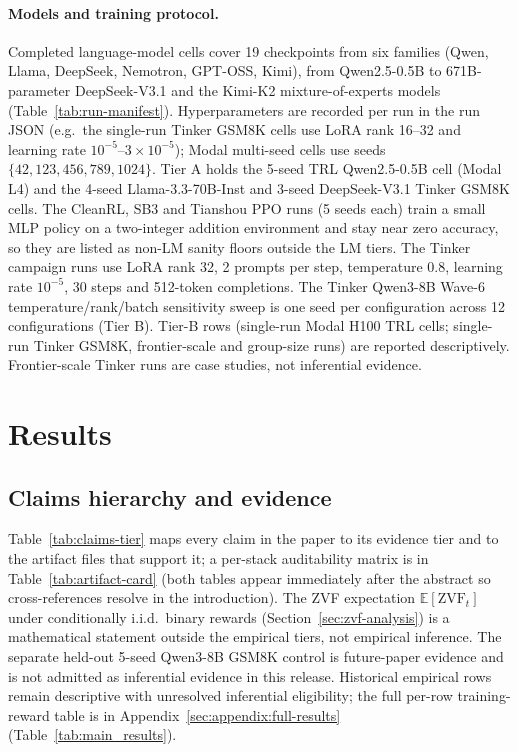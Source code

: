 \documentclass{article}
\begin{document}
\paragraph{Models and training protocol.}
Completed language-model cells cover 19 checkpoints from six families
(Qwen, Llama, DeepSeek, Nemotron, GPT-OSS, Kimi), from Qwen2.5-0.5B to
671B-parameter DeepSeek-V3.1 and the Kimi-K2 mixture-of-experts models
(Table~\ref{tab:run-manifest}). Hyperparameters are recorded per run in the
run JSON (e.g.\ the single-run Tinker GSM8K cells use LoRA rank 16--32 and
learning rate $10^{-5}$--$3\times10^{-5}$); Modal multi-seed cells use seeds
$\{42,123,456,789,1024\}$. Tier A holds the 5-seed TRL Qwen2.5-0.5B cell
(Modal L4) and the 4-seed Llama-3.3-70B-Inst and 3-seed DeepSeek-V3.1 Tinker
GSM8K cells. The CleanRL, SB3 and Tianshou PPO runs (5 seeds each) train a
small MLP policy on a two-integer addition environment and stay near zero
accuracy, so they are listed as non-LM sanity floors outside the LM tiers.
The Tinker campaign runs use LoRA rank 32, 2 prompts per step, temperature
0.8, learning rate $10^{-5}$, 30 steps and 512-token completions. The Tinker Qwen3-8B Wave-6
temperature/rank/batch sensitivity sweep is one seed per configuration
across 12 configurations (Tier B). Tier-B rows (single-run Modal H100 TRL
cells; single-run Tinker GSM8K, frontier-scale and group-size runs) are
reported descriptively. Frontier-scale Tinker runs are case studies,
not inferential evidence.

\section{Results}
\label{sec:results}

\subsection{Claims hierarchy and evidence}
\label{sec:main_results}

Table~\ref{tab:claims-tier} maps every claim in the paper to its evidence
tier and to the artifact files that support it; a per-stack auditability
matrix is in Table~\ref{tab:artifact-card} (both tables appear immediately
after the abstract so cross-references resolve in the introduction).
The ZVF expectation $\mathbb E[\mathrm{ZVF}_t]$ under conditionally
i.i.d.\ binary rewards (Section~\ref{sec:zvf-analysis}) is a mathematical
statement outside the empirical tiers, not empirical inference. The separate held-out
5-seed Qwen3-8B GSM8K control is future-paper evidence and is not admitted
as inferential evidence in this release. Historical empirical rows remain
descriptive with unresolved inferential eligibility; the full per-row
training-reward table is in Appendix~\ref{sec:appendix:full-results}
(Table~\ref{tab:main_results}).
\end{document}
